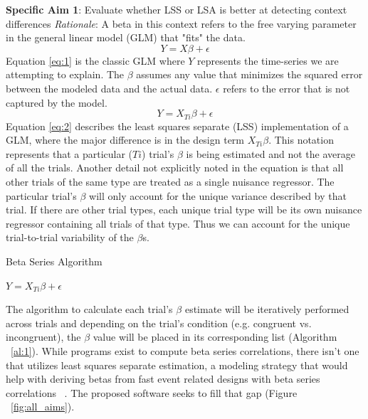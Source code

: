 \documentclass[phd,appendix,figures]{uithesis}
\begin{document}
\begin{itemize}
\textbf{Specific Aim 1}: Evaluate whether LSS or LSA is better at detecting context differences
\newline
\newline
\textit{Rationale}: A beta in this context refers to the free varying parameter in the general linear model (GLM) that "fits" the data.
\begin{equation}
	Y = X\beta + \epsilon 
	\label{eq:1}
\end{equation}
Equation \ref{eq:1} is the classic GLM where $Y$ represents the time-series we are attempting to explain.
The $\beta$ assumes any value that minimizes the squared error between the modeled data and the actual data. 
$\epsilon$ refers to the error that is not captured by the model.
\begin{equation} \label{eq:2}
Y = X_{Ti}\beta + \epsilon
\end{equation}
Equation \ref{eq:2} describes the least squares separate (LSS) implementation of a GLM, where the major difference is in the design term $X_{Ti}\beta$.
This notation represents that a particular ($Ti$) trial's $\beta$ is being estimated and not the average of all the trials.
Another detail not explicitly noted in the equation is that all other trials of the same type are treated as a single nuisance regressor.
The particular trial's $\beta$ will only account for the unique variance described by that trial.
If there are other trial types, each unique trial type will be its own nuisance regressor containing all trials of that type.
Thus we can account for the unique trial-to-trial variability of the $\beta$s.
\begin{algorithm}
	\caption{Beta Series Algorithm}\label{al:1}
	\begin{algorithmic}[1]
    		\STATE \texttt{$Y = X_{Ti}\beta + \epsilon$}
		\ENDFOR
	\end{algorithmic}
\end{algorithm}
The algorithm to calculate each trial's $\beta$ estimate will be iteratively performed across trials and depending on the trial's condition (e.g. congruent vs. incongruent), the $\beta$ value will be placed in its corresponding list (Algorithm ~\ref{al:1}).
While programs exist to compute beta series correlations, there isn't one that utilizes least squares separate estimation, a modeling strategy that would help with deriving betas from fast event related designs with beta series correlations ~\citep{Mumford2012,Gottlich2015}. 
The proposed software seeks to fill that gap (Figure ~\ref{fig:all_aims}).

\end{itemize}
\end{document}

